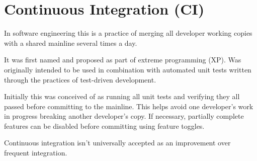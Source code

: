 \section{Continuous Integration (CI)}
\label{sec:Continuous Integration (CI)}

In software engineering this is a practice of merging all developer working copies with a shared mainline several times a day.

It was first named and proposed as part of extreme programming (XP). Was originally intended to be used in combination with automated unit tests written through the practices of test-driven development.

Initially this was conceived of as running all unit tests and verifying they all passed before committing to the mainline. This helps avoid one developer's work in progress breaking another developer's copy. If necessary, partially complete features can be disabled before committing using feature toggles.

Continuous integration isn't universally accepted as an improvement over frequent integration. 